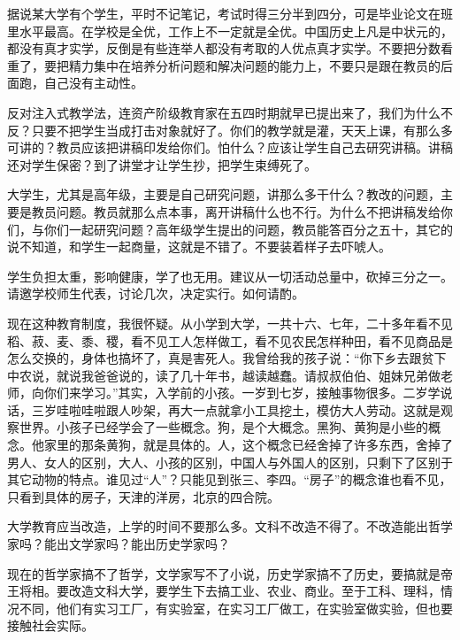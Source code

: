 据说某大学有个学生，平时不记笔记，考试时得三分半到四分，可是毕业论文在班里水平最高。在学校是全优，工作上不一定就是全优。中国历史上凡是中状元的，都没有真才实学，反倒是有些连举人都没有考取的人优点真才实学。不要把分数看重了，要把精力集中在培养分析问题和解决问题的能力上，不要只是跟在教员的后面跑，自己没有主动性。

反对注入式教学法，连资产阶级教育家在五四时期就早已提出来了，我们为什么不反？只要不把学生当成打击对象就好了。你们的教学就是灌，天天上课，有那么多可讲的？教员应该把讲稿印发给你们。怕什么？应该让学生自己去研究讲稿。讲稿还对学生保密？到了讲堂才让学生抄，把学生束缚死了。

大学生，尤其是高年级，主要是自己研究问题，讲那么多干什么？教改的问题，主要是教员问题。教员就那么点本事，离开讲稿什么也不行。为什么不把讲稿发给你们，与你们一起研究问题？高年级学生提出的问题，教员能答百分之五十，其它的说不知道，和学生一起商量，这就是不错了。不要装着样子去吓唬人。

学生负担太重，影响健康，学了也无用。建议从一切活动总量中，砍掉三分之一。请邀学校师生代表，讨论几次，决定实行。如何请酌。

现在这种教育制度，我很怀疑。从小学到大学，一共十六、七年，二十多年看不见稻、菽、麦、黍、稷，看不见工人怎样做工，看不见农民怎样种田，看不见商品是怎么交换的，身体也搞坏了，真是害死人。我曾给我的孩子说：“你下乡去跟贫下中农说，就说我爸爸说的，读了几十年书，越读越蠢。请叔叔伯伯、姐妹兄弟做老师，向你们来学习。”其实，入学前的小孩。一岁到七岁，接触事物很多。二岁学说话，三岁哇啦哇啦跟人吵架，再大一点就拿小工具挖土，模仿大人劳动。这就是观察世界。小孩子已经学会了一些概念。狗，是个大概念。黑狗、黄狗是小些的概念。他家里的那条黄狗，就是具体的。人，这个概念已经舍掉了许多东西，舍掉了男人、女人的区别，大人、小孩的区别，中国人与外国人的区别，只剩下了区别于其它动物的特点。谁见过“人”？只能见到张三、李四。“房子”的概念谁也看不见，只看到具体的房子，天津的洋房，北京的四合院。

大学教育应当改造，上学的时间不要那么多。文科不改造不得了。不改造能出哲学家吗？能出文学家吗？能出历史学家吗？

现在的哲学家搞不了哲学，文学家写不了小说，历史学家搞不了历史，要搞就是帝王将相。要改造文科大学，要学生下去搞工业、农业、商业。至于工科、理科，情况不同，他们有实习工厂，有实验室，在实习工厂做工，在实验室做实验，但也要接触社会实际。
